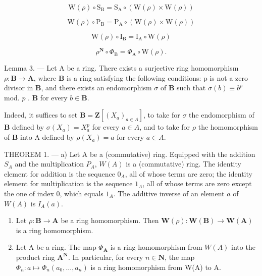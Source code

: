 \[
\mathrm{W} (\rho) \circ \mathrm{S} _ {\mathrm{B}} = \mathrm{S} _ {\mathrm{A}} \circ (\mathrm{W} (\rho) \times \mathrm{W} (\rho))\tag{20}
\]

\[
\mathrm{W} (\rho) \circ \mathrm{P} _ {\mathrm{B}} = \mathrm{P} _ {\mathrm{A}} \circ (\mathrm{W} (\rho) \times \mathrm{W} (\rho))\tag{21}
\]

\[
\mathrm{W} (\rho) \circ \mathrm{I} _ {\mathrm{B}} = \mathrm{I} _ {\mathrm{A}} \circ \mathrm{W} (\rho)\tag{22}
\]

\[
\rho^ {\mathbf {N}} \circ \Phi_ {\mathrm{B}} = \Phi_ {\mathrm{A}} \circ \mathrm{W} (\rho).
\]

Lemma 3. --- Let A be a ring. There exists a surjective ring homomorphism \(\rho: \mathbf{B} \to \mathbf{A}\), where \(\mathbf{B}\) is a ring satisfying the following conditions: p is not a zero divisor in \(\mathbf{B}\), and there exists an endomorphism \(\sigma\) of \(\mathbf{B}\) such that \(\sigma(b) \equiv b^p\) mod. \(p\) . \(\mathbf{B}\) for every \(b \in \mathbf{B}\).

Indeed, it suffices to set \(\mathbf{B} = \mathbf{Z}[(X_{a})_{a \in A}]\), to take for \(\sigma\) the endomorphism of \(\mathbf{B}\) defined by \(\sigma(X_{a}) = X_{a}^{p}\) for every \(a \in A\), and to take for \(\rho\) the homomorphism of \(\mathbf{B}\) into A defined by \(\rho(X_{a}) = a\) for every \(a \in A\).

THEOREM 1. --- a) Let A be a (commutative) ring. Equipped with the addition \(S_A\) and the multiplication \(P_A\), \(W(A)\) is a (commutative) ring. The identity element for addition is the sequence \(0_A\), all of whose terms are zero; the identity element for multiplication is the sequence \(1_A\), all of whose terms are zero except the one of index 0, which equals \(1_A\). The additive inverse of an element \(a\) of \(W(A)\) is \(I_A(a)\).

\begin{enumerate}
\def\labelenumi{\alph{enumi})}
\setcounter{enumi}{1}
\item
  Let \(\rho: \mathbf{B} \to \mathbf{A}\) be a ring homomorphism. Then \(\mathbf{W}(\rho): \mathbf{W}(\mathbf{B}) \to \mathbf{W}(\mathbf{A})\) is a ring homomorphism.
\item
  Let A be a ring. The map \(\Phi_{\mathbf{A}}\) is a ring homomorphism from \(W(A)\) into the product ring \(\mathbf{A}^{\mathbf{N}}\). In particular, for every \(n \in \mathbf{N}\), the map \(\Phi_{n}: a \mapsto \Phi_{n}(a_{0}, \ldots, a_{n})\) is a ring homomorphism from W(A) to A.
\end{enumerate}

